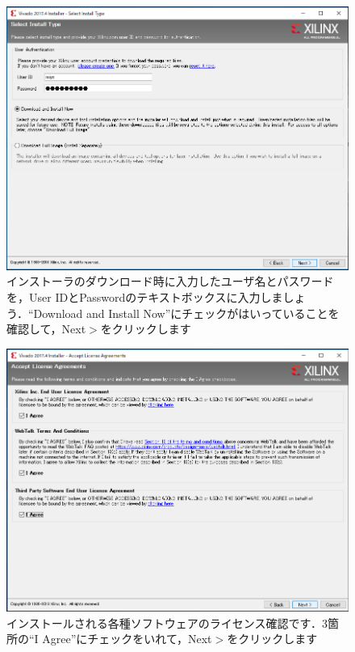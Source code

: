\documentclass[a4paper,dvipdfmx]{jsarticle}
\begin{document}
 \begin{figure}[H]
  \begin{center}
   \includegraphics[width=.8\textwidth]{appendix_figures/09_installer_main.png}
  \end{center}
  \caption{インストーラのダウンロード時に入力したユーザ名とパスワードを，User IDとPasswordのテキストボックスに入力しましょう．``Download and Install Now''にチェックがはいっていることを確認して，Next$\gt$をクリックします}
 \end{figure}

 \begin{figure}[H]
  \begin{center}
   \includegraphics[width=.8\textwidth]{appendix_figures/10_installer_main.png}
  \end{center}
  \caption{インストールされる各種ソフトウェアのライセンス確認です．3箇所の``I Agree''にチェックをいれて，Next$\gt$をクリックします}
 \end{figure}
\end{document}
